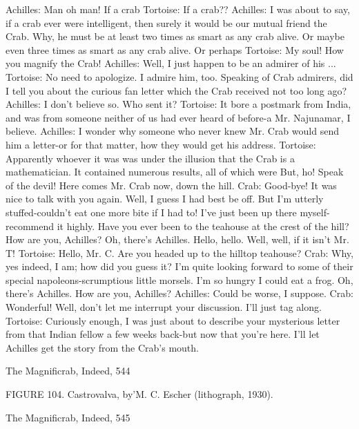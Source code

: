 {Achilles: Man oh man! If a crab
Tortoise: If a crab??
Achilles: I was about to say, if a crab ever were intelligent, then surely it would be our
  mutual friend the Crab. Why, he must be at least two times as smart as any crab alive.
  Or maybe even three times as smart as any crab alive. Or perhaps
Tortoise: My soul! How you magnify the Crab!
Achilles: Well, I just happen to be an admirer of his ...
Tortoise: No need to apologize. I admire him, too. Speaking of Crab admirers, did I tell
  you about the curious fan letter which the Crab received not too long ago?
Achilles: I don't believe so. Who sent it?
Tortoise: It bore a postmark from India, and was from someone neither of us had ever
  heard of before-a Mr. Najunamar, I believe.
Achilles: I wonder why someone who never knew Mr. Crab would send him a letter-or
  for that matter, how they would get his address. Tortoise: Apparently whoever it was
  was under the illusion that the Crab is a mathematician. It contained numerous results,
  all of which were But, ho! Speak of the devil! Here comes Mr. Crab now, down the
  hill. Crab: Good-bye! It was nice to talk with you again. Well, I guess I had best be
  off. But I'm utterly stuffed-couldn't eat one more bite if I had to! I've just been up there
  myself-recommend it highly. Have you ever been to the teahouse at the crest of the
  hill? How are you, Achilles? Oh, there's Achilles. Hello, hello. Well, well, if it isn't
  Mr. T!
Tortoise: Hello, Mr. C. Are you headed up to the hilltop teahouse? Crab: Why, yes
  indeed, I am; how did you guess it? I'm quite looking forward to some of their special
  napoleons-scrumptious little morsels. I'm so hungry I could eat a frog. Oh, there's
  Achilles. How are you, Achilles?
Achilles: Could be worse, I suppose.
Crab: Wonderful! Well, don't let me interrupt your discussion. I'll just tag along.
Tortoise: Curiously enough, I was just about to describe your mysterious letter from that
  Indian fellow a few weeks back-but now that you're here. I'll let Achilles get the story
  from the Crab’s mouth.




The Magnificrab, Indeed,                                                                  544

            FIGURE 104. Castrovalva, by'M. C. Escher (lithograph, 1930).




The Magnificrab, Indeed,                                                   545

}
